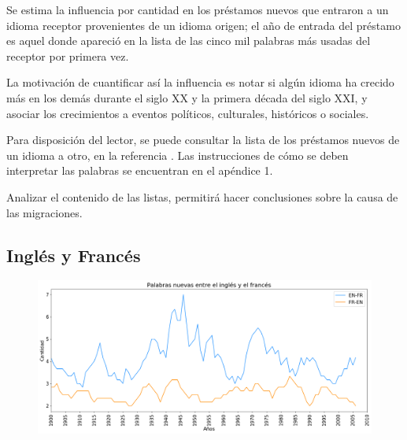 Se estima la influencia por cantidad en los  préstamos nuevos que entraron a un idioma receptor provenientes de un idioma origen; el año de entrada del préstamo es aquel donde apareció en la lista de las cinco mil palabras más usadas del receptor por primera vez. 

La motivación de cuantificar así la influencia es notar si algún idioma ha crecido más en los demás durante el siglo XX y la primera década del siglo XXI, y asociar los crecimientos a eventos políticos, culturales, históricos o sociales. 

Para disposición del lector, se puede consultar la lista de los préstamos nuevos de un idioma a otro, en la referencia \cite{prestamos_nuevos}.  Las instrucciones de cómo se deben interpretar las palabras se encuentran en el apéndice 1. 

Analizar el contenido de las listas, permitirá hacer conclusiones sobre la causa de las migraciones. 



\subsection{Inglés y Francés}


\begin{figure}[h!]
	\centering
	\includegraphics[scale=.38]{Cap_2/NC_1_S2_EN.png}
	\label{NC_EF}
	\caption{}
\end{figure}


